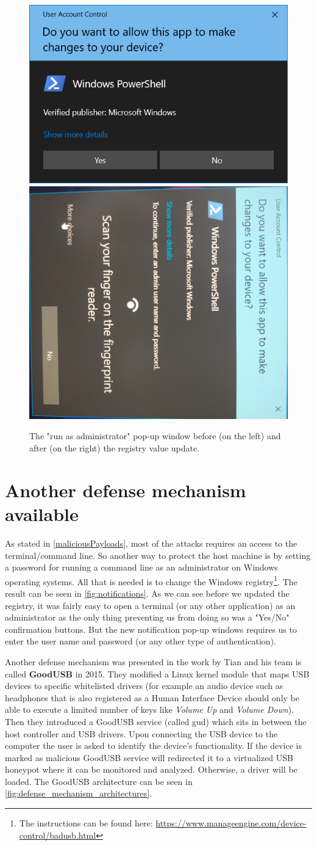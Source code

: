 \begin{figure}[ht]
    \centering
    \includegraphics[width=0.4\linewidth]{./obrazky-figures/basic_notification.PNG}
    \includegraphics[width=0.4\linewidth]{./obrazky-figures/notification_with_authentication.jpg}
    \caption{The "run as administrator" pop-up window before (on the left) and after (on the right) the registry value update.}
    \label{fig:notifications}
\end{figure}

\section{Another defense mechanism available}
As stated in \autoref{maliciousPayloads}, most of the attacks requires an access to the terminal/command line. So another way to protect the host machine is by setting a password for running a command line as an administrator on Windows operating systems. All that is needed is to change the Windows registry\footnote{The instructions can be found here: \url{https://www.manageengine.com/device-control/badusb.html}}. The result can be seen in \autoref{fig:notifications}. As we can see before we updated the registry, it was fairly easy to open a terminal (or any other application) as an administrator as the only thing preventing us from doing so was a "Yes/No" confirmation buttons. But the new notification pop-up windows requires us to enter the user name and password (or any other type of authentication).

Another defense mechanism was presented in the work \cite{goodusb} by Tian and his team is called \textbf{GoodUSB} in 2015. They modified a Linux kernel module that maps USB devices to specific whitelisted drivers (for example an audio device such as headphones that is also registered as a Human Interface Device should only be able to execute a limited number of keys like \emph{Volume Up} and \emph{Volume Down}). Then they introduced a GoodUSB service (called gud) which sits in between the host controller and USB drivers. Upon connecting the USB device to the computer the user is asked to identify the device's functionality. If the device is marked as malicious GoodUSB service will redirected it to a virtualized USB honeypot where it can be monitored and analyzed. Otherwise, a driver will be loaded. The GoodUSB architecture can be seen in \autoref{fig:defense_mechanism_architectures}.

